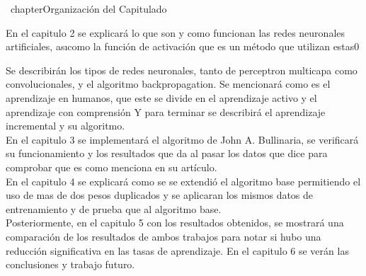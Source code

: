 \ chapter{Organización del Capitulado}
 
 
	 En el capitulo 2 se explicar\'a lo que son y como funcionan las redes neuronales artificiales, as\i como la función de activación que es un método que utilizan estas0

	 Se describir\'an los tipos de redes neuronales, tanto de perceptron multicapa como convolucionales, y el algoritmo backpropagation.
	 Se mencionar\'a como es el aprendizaje en humanos, que este se divide en el aprendizaje activo y el aprendizaje con comprensión
	 Y para terminar se describirá el aprendizaje incremental y su algoritmo.\\
	 
	 En el capitulo 3 se implementar\'a el algoritmo de John A. Bullinaria, se verificar\'a su funcionamiento y los resultados que da al pasar los datos que dice para comprobar que es como menciona en su art\'iculo.\\
	 En el capitulo 4 se explicar\'a como se se extendió el algoritmo base permitiendo el uso de mas de dos pesos duplicados y se aplicaran los mismos datos de entrenamiento y de prueba que al algoritmo base.\\
	 
	 Posteriormente, en el capitulo 5 con los resultados obtenidos, se mostrar\'a una comparación de los resultados de ambos trabajos para notar si hubo una reducción significativa en las tasas de aprendizaje. En el capitulo 6 se verán las conclusiones y trabajo futuro.